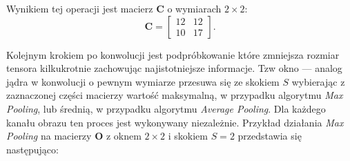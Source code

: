 \documentclass[pl,12pt]{aghdpl}
\begin{document}
\tikzset{external/export=true}
Wynikiem tej operacji jest macierz $\bm C$ o wymiarach $2\times 2$:
\begin{equation}
  \bm C = \begin{bmatrix}
    12 & 12\\
    10 & 17
  \end{bmatrix}.
\end{equation}

Kolejnym krokiem po konwolucji jest podpróbkowanie które zmniejsza rozmiar
tensora kilkukrotnie zachowując najistotniejsze informacje. Tzw okno --- analog
jądra w konwolucji o pewnym wymiarze przesuwa się ze skokiem $S$ wybierając z
zaznaczonej części macierzy wartość maksymalną, w przypadku algorytmu
\textit{Max Pooling}, lub średnią, w przypadku algorytmu \textit{Average
Pooling}. Dla każdego kanału obrazu ten proces jest wykonywany niezależnie.
Przykład działania \textit{Max Pooling} na macierzy $\bm O$ z oknem $2 \times
2$ i skokiem $S = 2$ przedstawia się następująco:
\tikzset{external/export=false}
\end{document}
